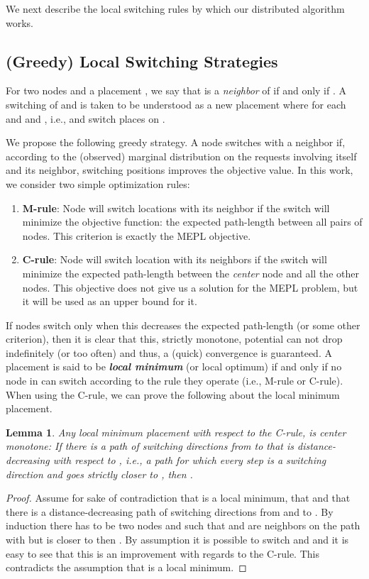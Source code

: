 \documentclass[conference]{IEEEtran}
\newtheorem{lemma}{Lemma}
\begin{document}
We next describe the local switching rules by which our distributed algorithm works.

\subsection{(Greedy) Local Switching Strategies}
For two nodes  and a placement , we say that  is a \emph{neighbor} of  if and only if .
A switching of  and  is taken to be understood as a new placement  where for each   and  and , i.e.,  and  switch places on .

We propose the following greedy strategy. A node switches with a neighbor if, according to the (observed) marginal distribution on the requests involving itself and its neighbor, switching positions improves the objective value.
In this work, we consider two simple optimization rules:

\begin{enumerate}

\item \textbf{M-rule}: Node will switch locations  with its neighbor if the switch will minimize the objective function: the expected path-length between all pairs of nodes. This criterion is exactly the MEPL objective.

\item \textbf{C-rule}: Node will switch location with its neighbors if the switch will minimize the expected path-length between the \emph{center} node and all the other nodes. This objective does not give us a solution for the MEPL problem, but it will be used as an upper bound for it. 

\end{enumerate}

If nodes switch only when this decreases the expected path-length (or some other criterion), then it is clear that this, strictly monotone, potential can not drop indefinitely (or too often) and thus, a (quick) convergence is guaranteed.
A placement  is said to be {\bf \emph{local minimum}} (or local optimum) if and only if no node in  can switch according to the rule they operate (i.e., M-rule or C-rule). When using the C-rule, we can prove the following about the local minimum placement.

\begin{lemma}\label{lem:monoton}
Any local minimum placement  with respect to the C-rule, is \emph{center monotone}: If there is a path of switching directions from  to  that is distance-decreasing with respect to , i.e., a path for which every step is a switching direction and goes strictly closer to , then .
\end{lemma}
\begin{proof}
Assume for sake of contradiction that  is a local minimum, that  and that there is a distance-decreasing path  of switching directions from  and to . By induction there has to be two nodes  and  such that  and  are neighbors on the path  with  but  is closer to  then . By assumption it is possible to switch  and  and it is easy to see that this is an improvement with regards to the C-rule. This contradicts the assumption that  is a local minimum. 
\end{proof}
\end{document}
